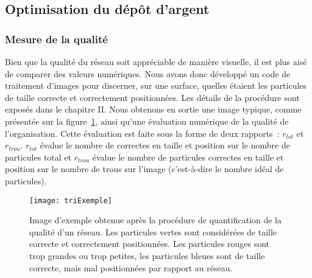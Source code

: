 	\subsection{Optimisation du dépôt d'argent}
	\label{sQuality}
	\subsubsection{Mesure de la qualité}
Bien que la qualité du réseau soit appréciable de manière visuelle, il est plus aisé de comparer des valeurs numériques. Nous avons donc développé un code de traitement d'images pour discerner, sur une surface, quelles étaient les particules de taille correcte et correctement positionnées. Les détails de la procédure sont exposés dans le chapitre II. Nous obtenons en sortie une image typique, comme présentée sur la figure~\ref{triExempleChpter3}, ainsi qu'une évaluation numérique de la qualité de l'organisation. Cette évaluation est faite sous la forme de deux rapports~: $r_{tot}$ et $r_{trou}$. $r_{tot}$ évalue le nombre de correctes en taille et position sur le nombre de particules total et $r_{trou}$ évalue le nombre de particules correctes en taille et position sur le nombre de trous sur l'image (c'est-à-dire le nombre idéal de particules). \par 
\begin{figure}[!htb]
\centering
\texttt{[image: triExemple]}
\caption{Image d'exemple obtenue après la procédure de quantification de la qualité d'un réseau. Les particules vertes sont considérées de taille correcte et correctement positionnées. Les particules rouges sont trop grandes ou trop petites, les particules bleues sont de taille correcte, mais mal positionnées par rapport au réseau.}
\label{triExempleChpter3}
\end{figure}
